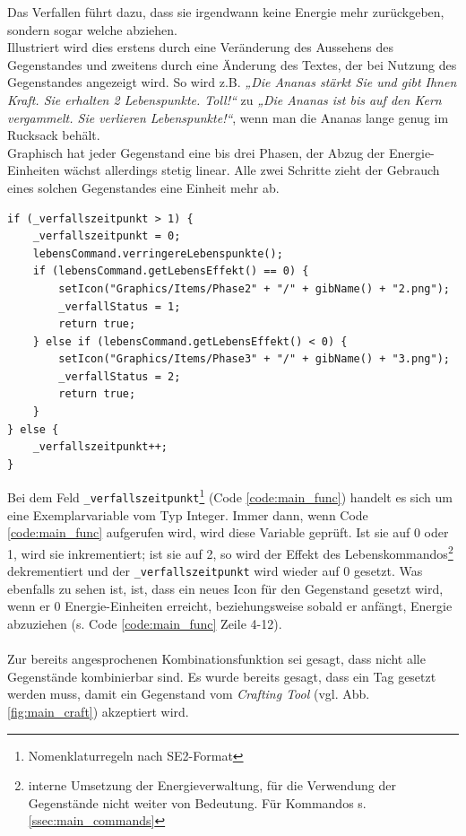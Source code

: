 \documentclass[12pt,twoside]{article}
\theoremstyle{plain}
\theoremstyle{definition}
\theoremstyle{remark}
\begin{document}
Das Verfallen führt dazu, dass sie irgendwann keine Energie mehr zurückgeben, sondern sogar welche abziehen.
\\
Illustriert wird dies erstens durch eine Veränderung des Aussehens des Gegenstandes und zweitens durch eine Änderung des Textes, der bei Nutzung des Gegenstandes angezeigt wird. So wird z.B. \textit{„Die Ananas stärkt Sie und gibt Ihnen Kraft. Sie erhalten 2 Lebenspunkte. Toll!“} zu \textit{„Die Ananas ist bis auf den Kern vergammelt. Sie verlieren Lebenspunkte!“}, wenn man die Ananas lange genug im Rucksack behält.
\\
Graphisch hat jeder Gegenstand eine bis drei Phasen, der Abzug der Energie-Einheiten wächst allerdings stetig linear.
Alle zwei Schritte zieht der Gebrauch eines solchen Gegenstandes eine Einheit mehr ab.
\begin{lstlisting}[caption=Teilimplementation der Verringerung der Energieregeneration, label=code:main_func]
if (_verfallszeitpunkt > 1) {
	_verfallszeitpunkt = 0;
	lebensCommand.verringereLebenspunkte();
	if (lebensCommand.getLebensEffekt() == 0) {
		setIcon("Graphics/Items/Phase2" + "/" + gibName() + "2.png");
		_verfallStatus = 1;
		return true;
	} else if (lebensCommand.getLebensEffekt() < 0) {
		setIcon("Graphics/Items/Phase3" + "/" + gibName() + "3.png");
		_verfallStatus = 2;
		return true;
	}
} else {
	_verfallszeitpunkt++;
}
\end{lstlisting}
Bei dem Feld \texttt{\_verfallszeitpunkt}\footnote{Nomenklaturregeln nach SE2-Format} (Code \ref{code:main_func}) handelt es sich um eine Exemplarvariable vom Typ Integer.
Immer dann, wenn Code \ref{code:main_func} aufgerufen wird, wird diese Variable geprüft.
Ist sie auf 0 oder 1, wird sie inkrementiert; ist sie auf 2, so wird der Effekt des Lebenskommandos\footnote{interne Umsetzung der Energieverwaltung, für die Verwendung der Gegenstände nicht weiter von Bedeutung. Für Kommandos s. \ref{ssec:main_commands}} dekrementiert und der \texttt{\_verfallszeitpunkt} wird wieder auf 0 gesetzt.
Was ebenfalls zu sehen ist, ist, dass ein neues Icon für den Gegenstand gesetzt wird, wenn er 0 Energie-Einheiten erreicht, beziehungsweise sobald er anfängt, Energie abzuziehen (s. Code \ref{code:main_func} Zeile 4-12).\\
\\
Zur bereits angesprochenen Kombinationsfunktion sei gesagt, dass nicht alle Gegenstände kombinierbar sind.
Es wurde bereits gesagt, dass ein Tag gesetzt werden muss, damit ein Gegenstand vom \textit{Crafting Tool} (vgl. Abb. \ref{fig:main_craft}) akzeptiert wird.
\end{document}
